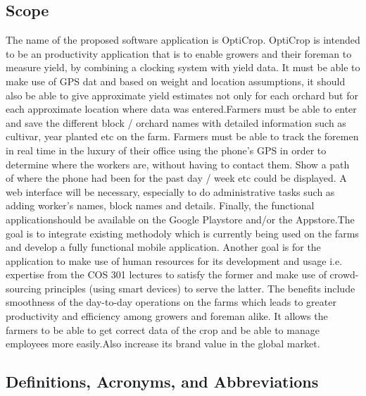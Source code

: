 \documentclass[runningheads,a4paper]{article}
\begin{document}
\subsection{Scope}
The name of the proposed software application is OptiCrop. OptiCrop is intended to be an productivity application that is to enable growers and their foreman to measure yield, by combining a clocking system with yield data. It must be able to make use of GPS dat and based on weight and location assumptions, it should also be able to give approximate yield estimates not only for each orchard but for each approximate location where data was entered.Farmers must be able to enter and save the
different block / orchard names with detailed information such as cultivar, year planted etc on the farm. Farmers must be able to track the foremen in real time in the luxury of their office using the phone’s
GPS in order to determine where the workers are, without having to contact them. Show a path of where the phone had been for the past day / week etc could be displayed. A web interface will be necessary, especially to do administrative tasks such as adding worker’s names, block
names and details. Finally, the functional applicationshould be available on the Google Playstore
and/or the Appstore.\newline \newline The goal is to integrate existing methodoly which is currently being used on the farms and develop a fully functional mobile application. Another goal is for the application to make use of human resources for its development and usage i.e. expertise from the COS 301 lectures to satisfy the former and make use of crowd-sourcing principles (using smart devices) to serve the latter. \newline \newline The benefits include smoothness of the day-to-day operations on the farms which leads to greater productivity and efficiency among growers  and foreman  alike. It allows the farmers to be able to get correct data of the crop and be able to manage employees more easily.Also increase its brand value in the global market.

\subsection{Definitions, Acronyms, and Abbreviations}
\end{document}
